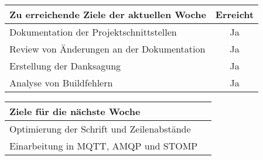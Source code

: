\begin{tabularx}{\textwidth}{Xc}
    \arrayrulecolor{OliveGreen}
    \toprule
    {\bfseries Zu erreichende Ziele der aktuellen Woche} & {\bfseries Erreicht} \\
    \midrule[2pt]
    Dokumentation der Projektschnittstellen              &Ja                    \\
    \rowcolor{OliveGreen!15}
    Review von Änderungen an der Dokumentation           &Ja                    \\
    \rowcolor{White}
    Erstellung der Danksagung                            &Ja                    \\
    \rowcolor{OliveGreen!15}
    Analyse von \latex{} Buildfehlern                    &Ja                    \\
    \bottomrule[2pt]
\end{tabularx}
%
\vspace{1cm}
%
\begin{tabularx}{\textwidth}{Xc}
    \arrayrulecolor{OliveGreen}
    \toprule
    {\bfseries Ziele für die nächste Woche}              &                      \\
    \midrule[2pt]
    Optimierung der Schrift und Zeilenabstände           &                      \\
    \rowcolor{OliveGreen!15}
    Einarbeitung in MQTT, AMQP und STOMP                 &                      \\
\end{tabularx}
